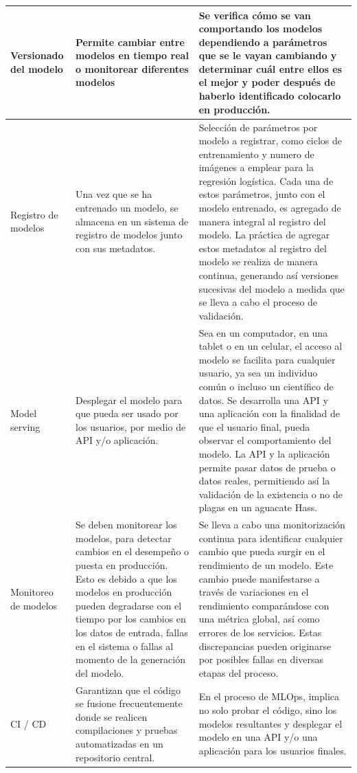 \begin{longtable}{|p{3cm}|p{5cm}|p{6cm}|}
        \hline
        Versionado del modelo & Permite cambiar entre modelos en tiempo real o monitorear diferentes modelos & Se verifica cómo se van comportando los modelos dependiendo a parámetros que se le vayan cambiando y determinar cuál entre ellos es el mejor y poder después de haberlo identificado colocarlo en producción.  \\
        \hline
        Registro de modelos & Una vez que se ha entrenado un modelo, se almacena en un sistema de registro de modelos junto con sus metadatos. & Selección de parámetros por modelo a registrar, como ciclos de entrenamiento y numero de imágenes a emplear para la regresión logística. Cada una de estos parámetros, junto con el modelo entrenado, es agregado de manera integral al registro del modelo. La práctica de agregar estos metadatos al registro del modelo se realiza de manera continua, generando así versiones sucesivas del modelo a medida que se lleva a cabo el proceso de validación. \\
        \hline
        Model serving & Desplegar el modelo para que pueda ser usado por los usuarios, por medio de API y/o aplicación. & Sea en un computador, en una tablet o en un celular, el acceso al modelo se facilita para cualquier usuario, ya sea un individuo común o incluso un científico de datos. Se desarrolla una API y una aplicación con la finalidad de que el usuario final, pueda observar el comportamiento del modelo. La API y la aplicación permite pasar datos de prueba o datos reales, permitiendo así la validación de la existencia o no de plagas en un aguacate Hass. \\
        \hline
        Monitoreo de modelos & Se deben monitorear los modelos, para detectar cambios en el desempeño o puesta en producción. Esto es debido a que los modelos en producción pueden degradarse con el tiempo por los cambios en los datos de entrada, fallas en el sistema o fallas al momento de la generación del modelo. & Se lleva a cabo una monitorización continua para identificar cualquier cambio que pueda surgir en el rendimiento de un modelo. Este cambio puede manifestarse a través de variaciones en el rendimiento comparándose con una métrica global, así como errores de los servicios. Estas discrepancias pueden originarse por posibles fallas en diversas etapas del proceso. \\
        \hline
        CI / CD & Garantizan que el código se fusione frecuentemente donde se realicen compilaciones y pruebas automatizadas en un repositorio central. & En el proceso de MLOps, implica no solo probar el código, sino los modelos resultantes y desplegar el modelo en una API y/o una aplicación para los usuarios finales. \\

\end{longtable}
